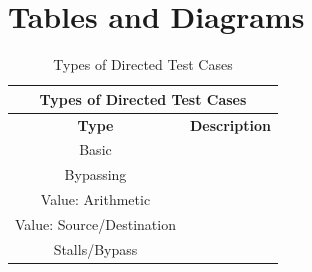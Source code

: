 \documentclass[10pt]{article}
\begin{document}
\pagebreak[4]

\section {Tables and Diagrams}


\begin{table}[h]
\begin{center}
\begin{tabular}{| c | c |}
\hline
\multicolumn{2}{|c|}{Types of Directed Test Cases}   \\
\hline
\textbf{Type}                         &    \textbf{Description}  	\\   \hline      
Basic            					  &           					\\
Bypassing                             &								\\
Value: Arithmetic           		  &          					\\        
Value: Source/Destination             & 							\\
Stalls/Bypass 						  & 							\\
\hline                                                 
\end{tabular}
\caption{Types of Directed Test Cases} 
\label{table:tests}
\end{center}
\end{table}


\end{document}
